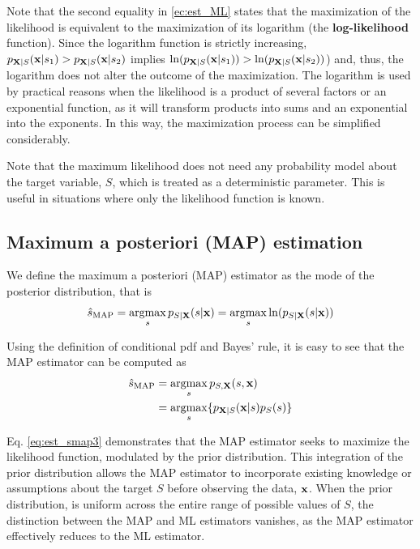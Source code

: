 {Note that the second equality in \eqref{ec:est_ML} states that the maximization of the likelihood is equivalent to the maximization of its logarithm (the \textbf{log-likelihood} function). Since the logarithm function is strictly increasing, $p_{{\bf X}|S}({\bf x}|s_1) > p_{{\bf X}|S}({\bf x}|s_2)$ implies $\ln(p_{{\bf X}|S}({\bf x}|s_1)) > \ln(p_{{\bf X}|S}({\bf x}|s_2))$) and, thus, the logarithm does not alter the outcome of the maximization}. The logarithm is used by practical reasons when the likelihood is a product of several factors or an exponential function, as it will transform products into sums and an exponential into the exponents. In this way, the maximization process can be simplified considerably.

{Note that the maximum likelihood does not need any probability model about the target variable, $S$, which is treated as a deterministic parameter. This is useful in situations where only the likelihood function is known}.


\subsection{Maximum a posteriori (MAP) estimation}

We define the maximum a posteriori (MAP) estimator as the mode of the posterior distribution, that is
\begin{equation}
\hat s_{\text{MAP}} = \operatorname*{argmax}_{s} p_{{S|\bf X}}(s|{\bf x})
                    = \operatorname*{argmax}_{s} \ln(p_{{S|\bf X}}(s|{\bf x}))
                   \label{ec:est_MAP}
\end{equation}

{Using the definition of conditional pdf and Bayes' rule, it is easy to see that the MAP estimator can be computed as
\begin{align}
\label{eq:est_smap2}
\hat s_{\text{MAP}} 
	&= \operatorname*{argmax}_{s} p_{{S,\bf X}}(s,{\bf x})   \\
\label{eq:est_smap3}
    &= \operatorname*{argmax}_{s} \{p_{{\bf X}|S}({\bf x}|s) p_S(s)\}
\end{align}}

{Eq. \eqref{eq:est_smap3} demonstrates that the MAP estimator seeks to maximize the likelihood function, modulated by the prior distribution. This integration of the prior distribution allows the MAP estimator to incorporate existing knowledge or assumptions about the target $S$ before observing the data, ${\bf x}$. When the prior distribution, is uniform across the entire range of possible values of $S$, the distinction between the MAP and ML estimators vanishes, as the MAP estimator effectively reduces to the ML estimator.}

